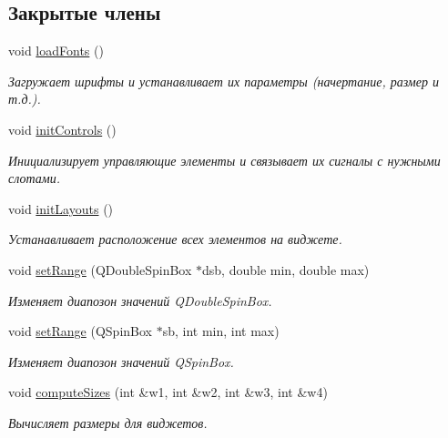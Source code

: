 \subsection*{Закрытые члены}
\begin{DoxyCompactItemize}
\item 
void \hyperlink{class_filter_parameters_widget_aeadea883731fe8ef61b3577319578e02}{load\+Fonts} ()
\begin{DoxyCompactList}\small\item\em Загружает шрифты и устанавливает их параметры (начертание, размер и т.\+д.). \end{DoxyCompactList}\item 
\hypertarget{class_filter_parameters_widget_a4f05c0618d6e1f55521da3390266821f}{}\label{class_filter_parameters_widget_a4f05c0618d6e1f55521da3390266821f} 
void \hyperlink{class_filter_parameters_widget_a4f05c0618d6e1f55521da3390266821f}{init\+Controls} ()
\begin{DoxyCompactList}\small\item\em Инициализирует управляющие элементы и связывает их сигналы с нужными слотами. \end{DoxyCompactList}\item 
\hypertarget{class_filter_parameters_widget_a2381f9066d935a3e140d29e785d23f80}{}\label{class_filter_parameters_widget_a2381f9066d935a3e140d29e785d23f80} 
void \hyperlink{class_filter_parameters_widget_a2381f9066d935a3e140d29e785d23f80}{init\+Layouts} ()
\begin{DoxyCompactList}\small\item\em Устанавливает расположение всех элементов на виджете. \end{DoxyCompactList}\item 
void \hyperlink{class_filter_parameters_widget_afca68a62342f0aa6be9133df55134993}{set\+Range} (Q\+Double\+Spin\+Box $\ast$dsb, double min, double max)
\begin{DoxyCompactList}\small\item\em Изменяет диапозон значений Q\+Double\+Spin\+Box. \end{DoxyCompactList}\item 
void \hyperlink{class_filter_parameters_widget_a5ba781e8221a8cc8003a950fafed1fc1}{set\+Range} (Q\+Spin\+Box $\ast$sb, int min, int max)
\begin{DoxyCompactList}\small\item\em Изменяет диапозон значений Q\+Spin\+Box. \end{DoxyCompactList}\item 
void \hyperlink{class_filter_parameters_widget_a8efc68dd4f006fa773873aa6710fbc33}{compute\+Sizes} (int \&w1, int \&w2, int \&w3, int \&w4)
\begin{DoxyCompactList}\small\item\em Вычисляет размеры для виджетов. \end{DoxyCompactList}\end{DoxyCompactItemize}
